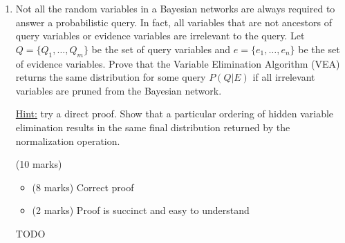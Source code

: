 \documentclass[12pt]{article}
\begin{document}
\begin{enumerate}[font=\Large,label=(\alph*)]
    \underline{Hint:} Consider using the fundamental conditional independence relationships discussed in Lecture 8.
    
    \newpage
    \begin{markscheme}
    (10 marks)
    \begin{itemize}
    \item
    (8 marks) Correct proof
    \item
    (2 marks) Proof is succinct and easy to understand
    \end{itemize}
    \end{markscheme}

    \begin{sol}
        {\color{blue} 
        For X to be conditionally independent with any node N given B , there should not be a path from X to N that does not go through B. Since B includes all children and parents of X, this holds for all N and thus X is conditionally independent of every variable in the network,conditioned on its Markov blanket
        }
    \end{sol}
    
    \item Not all the random variables in a Bayesian networks are always required to answer a probabilistic query. In fact, all variables that are not ancestors of query variables or evidence variables are irrelevant to the query. Let $Q = \{Q_1, \hdots, Q_m\}$ be the set of query variables and $e = \{e_1, \hdots,e_n\}$ be the set of evidence variables. Prove that the Variable Elimination Algorithm (VEA) returns the same distribution for some query $P(Q|E)$ if all irrelevant variables are pruned from the Bayesian network.
    
    \underline{Hint:} try a direct proof. Show that a particular ordering of hidden variable elimination results in the same final distribution returned by the normalization operation.
    
    \begin{markscheme}
    (10 marks)
    
    \begin{itemize}
    \item
    (8 marks) Correct proof
    \item
    (2 marks) Proof is succinct and easy to understand
    \end{itemize}
    \end{markscheme}

    \begin{sol}
        {\color{blue} 
            TODO
        }
        \end{sol}

\end{enumerate}
\end{document}
